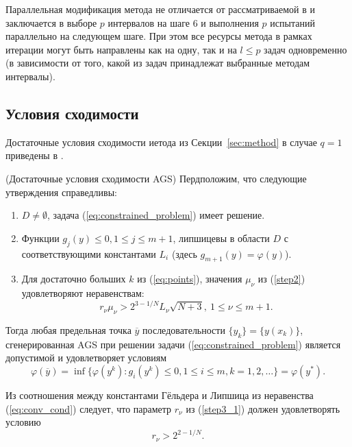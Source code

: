 Параллельная модификация метода не отличается от рассматриваемой в \cite{BarkalovStrongin2018}
и заключается в выборе \(p\) интервалов на шаге 6 и выполнения \(p\) испытаний параллельно
на следующем шаге. При этом все ресурсы метода в рамках итерации могут быть направлены как на одну, так и
на \(l\leqslant p\) задач одновременно (в зависимости от того, какой из задач принадлежат выбранные методам интервалы).

\subsection{Условия сходимости}
\label{sec:conv_method}

Достаточные условия сходимости иетода из Секции~\ref{sec:method} в случае \(q=1\) приведены в \cite{Strongin2000}.
\begin{theorem} (Достаточные условия сходимости AGS)
  \label{th:single_conv}
  Пердположим, что следующие утверждения справедливы:
  \begin{enumerate}
    \item \(D\ne\emptyset\), задача (\ref{eq:constrained_problem}) имеет решение.
    \item Функции \(g_j(y)\leqslant 0, 1\leqslant j\leqslant m + 1\), липшицевы в области \(D\) с соответствующими константами \(L_i\)
     (здесь \(g_{m+1}(y)=\varphi(y)\)).
    \item Для достаточно больших \(k\) из (\ref{eq:points}),
    значения \(\mu_\nu\) из (\ref{step2}) удовлетворяют неравенствам:
    \begin{equation}
      r_\nu\mu_\nu > 2^{3-1/N}L_\nu \sqrt{N+3},\: 1\leqslant \nu \leqslant m + 1.
    \end{equation}
  \end{enumerate}
  Тогда любая предельная точка \(\overline{y}\) последовательности \(\{y_k\} = \{y(x_k)\}\), сгенерированная
  AGS при решении задачи (\ref{eq:constrained_problem}) является допустимой и удовлетворяет условиям
\begin{equation}
  \label{eq:conv_cond}
  \varphi(\overline{y})=\inf\{ \varphi(y^k): g_i(y^k)\leqslant 0,1\leqslant i\leqslant m, k=1,2,\dots\}=\varphi(y^*).
\end{equation}
\end{theorem}

\begin{remark}
  \label{rem:r1}
  Из соотношения между константами Гёльдера и Липшица из неравенства (\ref{eq:conv_cond}) следует, что
  параметр \(r_\nu\) из (\ref{step3_1}) должен удовлетворять условию
  \begin{equation}
    r_\nu > 2^{2 - 1/N}.
  \end{equation}
\end{remark}


